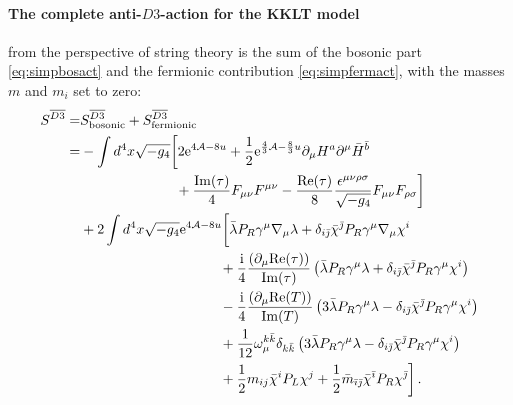 \documentclass[12pt]{report}
\newcommand{\bea}{\begin{equation}\begin{aligned}}
\newcommand{\eea}{\end{aligned}\end{equation}}
\def\rmi{{\rm i}}
\def\rme{{\rm e}}
\def\ib{{\bar \imath}}
\def\jb{{\bar \jmath}}
\def\rmre{{\rm Re}}
\def\rmim{{\rm Im}}
\begin{document}
\paragraph{The complete anti-$D3$-action for the KKLT model} from the perspective of string theory is the sum of the bosonic part \eqref{eq:simpbosact} and the fermionic contribution \eqref{eq:simpfermact}, with the masses $m$ and $m_i$ set to zero:
\bea 
S^{\overline{D3}} 
=& S^{\overline{D3}}_{\text{bosonic}} + S^{\overline{D3}}_{\text{fermionic}}\\
=& - \int d^4x \sqrt{-g_4} \bigg[ 2 \rme^{4\mathcal{A}-8u} + \frac{1}{2} \rme^{\frac{4}{3} \mathcal{A}-\frac{8}{3}u}\partial_\mu H^a \partial^\mu \bar{H}^{\bar{b}}\\
&\qquad\qquad\qquad\;\;\; + \frac{\rmim(\tau)}{4} F_{\mu\nu}F^{\mu\nu} - \frac{\rmre(\tau)}{8} \frac{\epsilon^{\mu\nu\rho\sigma}}{\sqrt{-g_4}} F_{\mu\nu}F_{\rho\sigma}\bigg]\\
& + 2 \int d^4x \sqrt{-g_4} \rme^{4\mathcal{A}-8u} \bigg[ \bar{\lambda} P_R \gamma^\mu \nabla_\mu \lambda + \delta_{i\jb} \bar{\chi}^\jb P_R \gamma^\mu \nabla_\mu \chi^i\\
&\qquad\qquad\qquad\qquad\qquad + \frac{\rmi}{4} \frac{\left(\partial_\mu \rmre(\tau)\right)}{\rmim(\tau)} \left( \bar{\lambda} P_R \gamma^\mu \lambda + \delta_{i\jb} \bar{\chi}^\jb P_R \gamma^\mu \chi^i\right)\\
&\qquad\qquad\qquad\qquad\qquad - \frac{\rmi}{4} \frac{\left(\partial_\mu \rmre(T)\right)}{\rmim(T)} \left(3 \bar{\lambda} P_R \gamma^\mu \lambda - \delta_{i\jb} \bar{\chi}^\jb P_R \gamma^\mu \chi^i\right)\\
&\qquad\qquad\qquad\qquad\qquad + \frac{1}{12} \omega_\mu^{k\bar{k}} \delta_{k\bar{k}} \left(3 \bar{\lambda} P_R \gamma^\mu \lambda - \delta_{i\jb} \bar{\chi}^\jb P_R \gamma^\mu \chi^i\right)\\
&\qquad\qquad\qquad\qquad\qquad + \frac{1}{2} m_{ij} \bar{\chi}^i P_L \chi^j + \frac{1}{2} \bar{m}_{\ib\jb} \bar{\chi}^\ib P_R \chi^\jb\bigg]\,.
\label{eq:simpbraneact}
\eea
\end{document}
